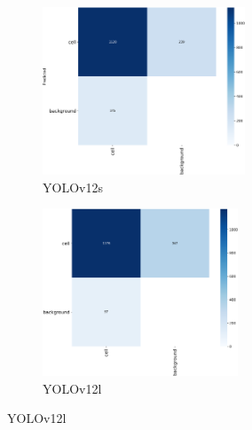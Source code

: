 \documentclass[12pt,a4paper,onecolumn,oneside]{report}
\begin{document}
\begin{figure}[H]
  \vspace{0.1cm}
  \begin{subfigure}[b]{0.45\textwidth}
    \centering
    \includegraphics[height=5cm]{figuras/resultados experimentacion/yolov12s/original_test/confusion_matrix.png}
    \vspace{-0.3cm}
    \caption{\footnotesize YOLOv12s}
    \label{fig:confusion_yolov12s_original_test}
  \end{subfigure}
  \hfill
  \begin{subfigure}[b]{0.45\textwidth}
    \centering
    \includegraphics[height=5cm]{figuras/resultados experimentacion/yolov12l/original_test/confusion_matrix.png}
    \vspace{-0.3cm}
    \caption{\footnotesize YOLOv12l}
    \label{fig:confusion_yolov12l_original_test}
  \end{subfigure}
  

\end{figure}
\end{document}
